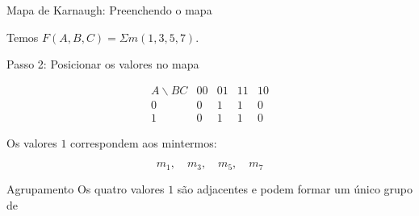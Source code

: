 \begin{frame}{Mapa de Karnaugh: Preenchendo o mapa}
    \small

    Temos $F(A,B,C)=\Sigma m(1,3,5,7)$.

    \begin{block}{Passo 2: Posicionar os valores no mapa}

        \[
        \begin{array}{c|cccc}
            A\backslash BC & 00 & 01 & 11 & 10 \\ \hline
            0 & 0 & \boxed{1} & \boxed{1} & 0 \\
            1 & 0 & \boxed{1} & \boxed{1} & 0
        \end{array}
        \]

    \end{block}

    Os valores $1$ correspondem aos mintermos:

    \[
        m_1,\quad m_3,\quad m_5,\quad m_7
    \]

    \begin{alertblock}{Agrupamento}
        Os quatro valores $1$ são adjacentes e podem formar
        um único grupo de 

    \end{alertblock}

\end{frame}
